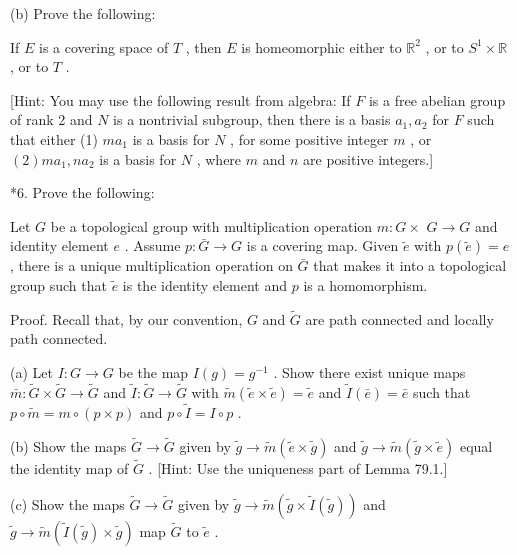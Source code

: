 (b) Prove the following:

\begin{theorem} If \(E\) is a covering space of \(T\) , then \(E\) is homeomorphic either to \({\mathbb{R}}^{2}\) , or to \({S}^{1} \times  \mathbb{R}\) , or to \(T\) .
\end{theorem}

[Hint: You may use the following result from algebra: If \(F\) is a free abelian group of rank 2 and \(N\) is a nontrivial subgroup, then there is a basis \({a}_{1},{a}_{2}\) for \(F\) such that either (1) \(m{a}_{1}\) is a basis for \(N\) , for some positive integer \(m\) , or \(\left( 2\right) m{a}_{1},n{a}_{2}\) is a basis for \(N\) , where \(m\) and \(n\) are positive integers.]

*6. Prove the following:

\begin{theorem} Let \(G\) be a topological group with multiplication operation \(m : G \times\)  \(G \rightarrow  G\) and identity element \(e\) . Assume \(p : \bar{G} \rightarrow  G\) is a covering map. Given \(\widetilde{e}\) with \(p\left( \widetilde{e}\right)  = e\) , there is a unique multiplication operation on \(\bar{G}\) that makes it into a topological group such that \(\widetilde{e}\) is the identity element and \(p\) is a homomorphism.
\end{theorem}
Proof. Recall that, by our convention, \(G\) and \(\widetilde{G}\) are path connected and locally path connected.

(a) Let \(I : G \rightarrow  G\) be the map \(I\left( g\right)  = {g}^{-1}\) . Show there exist unique maps \(\bar{m} : \widetilde{G} \times  \widetilde{G} \rightarrow  \widetilde{G}\) and \(\widetilde{I} : \widetilde{G} \rightarrow  \widetilde{G}\) with \(\widetilde{m}\left( {\widetilde{e} \times  \widetilde{e}}\right)  = \widetilde{e}\) and \(\widetilde{I}\left( \bar{e}\right)  = \bar{e}\) such that \(p \circ  \widetilde{m} = m \circ  \left( {p \times  p}\right)\) and \(p \circ  \widetilde{I} = I \circ  p\) .

(b) Show the maps \(\widetilde{G} \rightarrow  \widetilde{G}\) given by \(\widetilde{g} \rightarrow  \widetilde{m}\left( {\widetilde{e} \times  \widetilde{g}}\right)\) and \(\widetilde{g} \rightarrow  \widetilde{m}\left( {\widetilde{g} \times  \widetilde{e}}\right)\) equal the identity map of \(\widetilde{G}\) . [Hint: Use the uniqueness part of Lemma 79.1.]

(c) Show the maps \(\widetilde{G} \rightarrow  \widetilde{G}\) given by \(\widetilde{g} \rightarrow  \widetilde{m}\left( {\widetilde{g} \times  \widetilde{I}\left( \widetilde{g}\right) }\right)\) and \(\widetilde{g} \rightarrow  \widetilde{m}\left( {\widetilde{I}\left( \widetilde{g}\right)  \times  \widetilde{g}}\right)\) map \(\widetilde{G}\) to \(\widetilde{e}\) .

